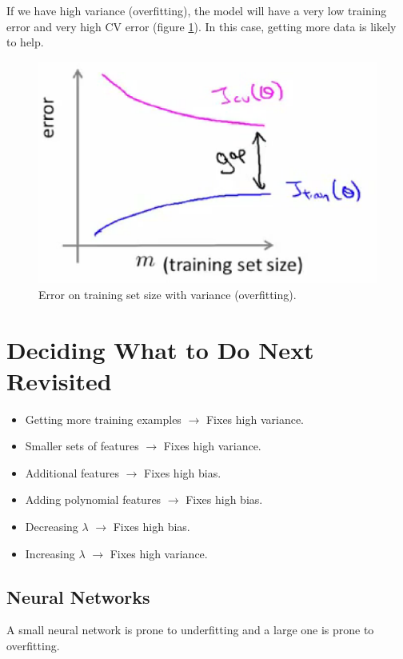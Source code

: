 \documentclass[10pt]{extarticle}
\begin{document}
If we have high variance (overfitting), the model will have a very low
training error and very high CV error (figure
\ref{fig:error_training_size_variance}). In this case, getting more data
is likely to help.

\begin{figure}
\centering
\includegraphics[width=\textwidth]{img/error_training_size_variance.eps}
\caption{Error on training set size with variance (overfitting).}
\label{fig:error_training_size_variance}
\end{figure}

\section{Deciding What to Do Next
Revisited}\label{deciding-what-to-do-next-revisited}

\begin{itemize}
\itemsep1pt\parskip0pt
\item
  Getting more training examples $\rightarrow$ Fixes high variance.
\item
  Smaller sets of features $\rightarrow$ Fixes high variance.
\item
  Additional features $\rightarrow$ Fixes high bias.
\item
  Adding polynomial features $\rightarrow$ Fixes high bias.
\item
  Decreasing $\lambda$ $\rightarrow$ Fixes high bias.
\item
  Increasing $\lambda$ $\rightarrow$ Fixes high variance.
\end{itemize}

\subsection{Neural Networks}\label{neural-networks}

A small neural network is prone to underfitting and a large one is prone
to overfitting.




    \nocite{*}



\end{document}
